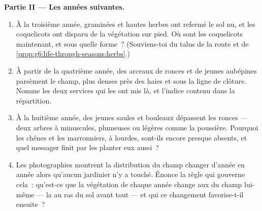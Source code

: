 \begin{problem}
\medskip\noindent\textbf{Partie II --- Les années suivantes.}
\begin{enumerate}[resume]
  \item À la troisième année, graminées et hautes herbes ont
        refermé le sol nu, et les coquelicots ont disparu de la
        végétation sur pied. Où sont les coquelicots maintenant, et
        sous quelle forme~? (Souviens-toi du talus de la route et
        de \cref{prop:g6:life-through-seasons:herbs}.)
  \item À partir de la quatrième année, des arceaux de ronces et de
        jeunes aubépines parsèment le champ, plus denses près des
        haies et sous la ligne de clôture. Nomme les deux services
        qui les ont mis là, et l'indice contenu dans la
        répartition.
  \item À la huitième année, des jeunes saules et bouleaux
        dépassent les ronces --- deux arbres à  minuscules,
        plumeuses ou légères comme la poussière. Pourquoi les
        chênes et les marronniers, à  lourdes, sont-ils
        encore presque absents, et quel messager  finit par
        les planter eux aussi~?
  \item Les photographies montrent la distribution du champ changer
        d'année en année alors qu'aucun jardinier n'y a touché.
        Énonce la règle qui gouverne cela~: qu'est-ce que la
        végétation de chaque année change aux  du champ
        lui-même --- la  au ras du sol avant tout --- et qui
        ce changement favorise-t-il ensuite~?
\end{enumerate}


\end{problem}

